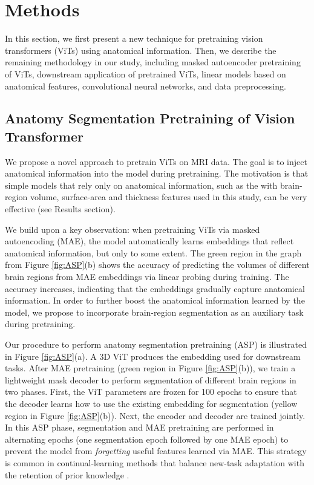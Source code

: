 \documentclass[pdflatex,sn-nature]{sn-jnl}%
\newif\ifhighlight
\newcommand{\rev}[1]{\ifhighlight{\color{blue}{}#1}\else#1\fi}%
\newcommand{\revdel}[1]{\ifhighlight{\color{red}\sout{#1}}\fi}
\theoremstyle{thmstyleone}%
\theoremstyle{thmstyletwo}%
\theoremstyle{thmstylethree}%
\begin{document}
\section*{Methods}\label{sec:method}

In this section, we first present a new technique for pretraining vision transformers (ViTs) using anatomical information. Then, we describe the remaining methodology in our study, including masked autoencoder pretraining of ViTs, downstream application of pretrained ViTs, linear models based on anatomical features, convolutional neural networks, and data preprocessing.

\subsection*{Anatomy Segmentation Pretraining of Vision Transformer}

We propose a novel approach to pretrain ViTs on MRI data. The goal is to inject anatomical information into the model during pretraining. The motivation is that simple models that rely only on anatomical information, such as the \revdel{logistic-regression model} with brain-region volume\rev{, surface-area and thickness} \revdel{and surface }features used in this study, can be very effective (see Results section). 

We build upon a key observation: when pretraining ViTs via masked autoencoding (MAE), the model automatically learns embeddings that reflect anatomical information, but only to some extent. The green region in the graph from Figure \ref{fig:ASP}(b) shows the accuracy of predicting the volumes of different brain regions from MAE embeddings via linear probing during training. The accuracy increases, indicating that the embeddings gradually capture anatomical information. In order to further boost the anatomical information learned by the model, we propose to incorporate brain-region segmentation as an auxiliary task during pretraining. 

Our procedure to perform anatomy segmentation pretraining (ASP) is illustrated in Figure \ref{fig:ASP}(a). A 3D ViT produces the embedding used for downstream tasks. After MAE pretraining (green region in Figure \ref{fig:ASP}(b)), we train a lightweight mask decoder to perform segmentation of different brain regions in two phases. First, the ViT parameters are frozen\rev{ for 100 epochs} to ensure that the decoder learns how to use the existing embedding for segmentation (yellow region in Figure \ref{fig:ASP}(b)). Next, the encoder and decoder are trained jointly. In this ASP phase, segmentation and MAE pretraining are performed in alternating epochs\rev{ (one segmentation epoch followed by one MAE epoch)} to prevent the model from \textit{forgetting} useful features learned via MAE. This strategy is common in continual-learning methods that balance new-task adaptation with the retention of prior knowledge \cite{Kirkpatrick2017,li2017,rebuffi2017}.
\end{document}
